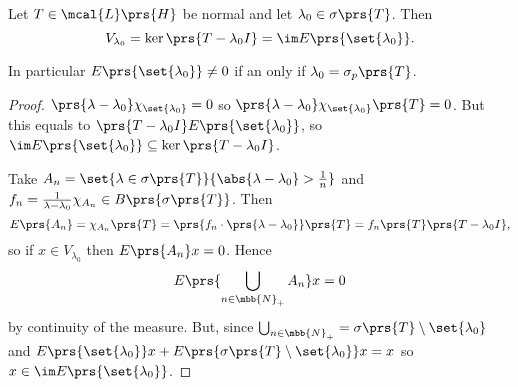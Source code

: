 \documentclass[10pt, twoside]{book}
\begin{document}
\begin{proposition}
Let $T \in \mcal{L}\prs{H}$ be normal and let $\lambda_0 \in \sigma\prs{T}$.
Then
\[V_{\lambda_0} = \ker\prs{T - \lambda_0 I} = \im E \prs{\set{\lambda_0}} \text{.}\]

In particular $E\prs{\set{\lambda_0}} \neq 0$ if an only if $\lambda_0 = \sigma_p\prs{T}$.
\end{proposition}

\begin{proof}
$\prs{\lambda - \lambda_0} \chi_{\set{\lambda_0}} = 0$ so $\prs{\lambda - \lambda_0} \chi_{\set{\lambda_0}} \prs{T} = 0$. But this equals to $\prs{T- \lambda_0 I} E\prs{\set{\lambda_0}}$, so $\im E\prs{\set{\lambda_0}} \subseteq \ker \prs{T - \lambda_0 I}$.

Take $A_n = \set{\lambda \in \sigma\prs{T}}{\abs{\lambda - \lambda_0} > \frac{1}{n}}$ and $f_n = \frac{1}{\lambda - \lambda_0} \chi_{A_n} \in B\prs{\sigma\prs{T}}$. Then
\[E\prs{A_n} = \chi_{A_n}\prs{T} = \prs{f_n \cdot \prs{\lambda - \lambda_0}}\prs{T} = f_n\prs{T} \prs{T - \lambda_0 I} \text{,}\]
so if $x \in V_{\lambda_0}$ then $E\prs{A_n} x = 0$.
Hence
\[E\prs{\bigcup_{n \in \mbb{N}_+} A_n} x = 0\]
by continuity of the measure.
But, since $\bigcup_{n \in \mbb{N}_+} = \sigma\prs{T} \setminus \set{\lambda_0}$ and $E \prs{\set{\lambda_0}} x + E\prs{\sigma\prs{T} \setminus \set{\lambda_0}} x = x$
so $x \in \im E \prs{\set{\lambda_0}}$.
\end{proof}
\end{document}
